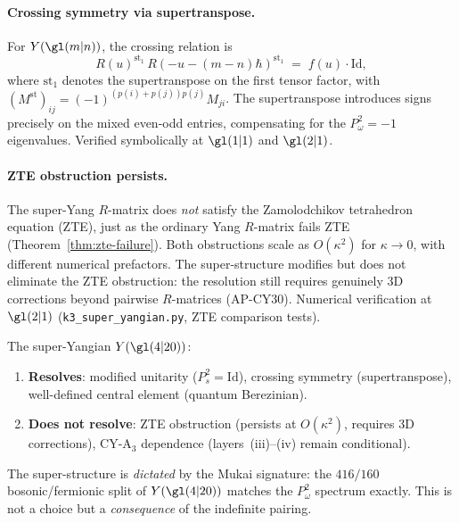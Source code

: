 \paragraph{Crossing symmetry via supertranspose.}
For $Y(\gl(m|n))$, the crossing relation is
\[
  R(u)^{\mathrm{st}_1}\, R(-u - (m-n)\hbar)^{\mathrm{st}_1}
  \;=\; f(u) \cdot \mathrm{Id},
\]
where $\mathrm{st}_1$ denotes the supertranspose on the first tensor factor,
with $(M^{\mathrm{st}})_{ij} = (-1)^{(p(i)+p(j))p(j)} M_{ji}$.
The supertranspose introduces signs precisely on the mixed even-odd entries,
compensating for the $P_\omega^2 = -1$ eigenvalues.
Verified symbolically at $\gl(1|1)$ and $\gl(2|1)$.

\paragraph{ZTE obstruction persists.}
The super-Yang $R$-matrix does \emph{not} satisfy the Zamolodchikov
tetrahedron equation (ZTE), just as the ordinary Yang $R$-matrix fails ZTE
(Theorem~\ref{thm:zte-failure}).  Both obstructions scale as
$O(\kappa^2)$ for $\kappa \to 0$, with different numerical prefactors.
The super-structure modifies but does not eliminate the ZTE
obstruction: the resolution still requires genuinely 3D corrections
beyond pairwise $R$-matrices (AP-CY30).
Numerical verification at $\gl(2|1)$
(\texttt{k3\_super\_yangian.py}, ZTE comparison tests).

\begin{remark}
\label{rem:k3-super-summary}
The super-Yangian $Y(\gl(4|20))$:
\begin{enumerate}[label=(\alph*)]
\item \textbf{Resolves}: modified unitarity ($P_s^2 = \mathrm{Id}$),
  crossing symmetry (supertranspose), well-defined central element
  (quantum Berezinian).
\item \textbf{Does not resolve}: ZTE obstruction (persists at $O(\kappa^2)$,
  requires 3D corrections), CY-A$_3$ dependence (layers~(iii)--(iv)
  remain conditional).
\end{enumerate}
The super-structure is \emph{dictated} by the Mukai signature:
the $416/160$ bosonic/fermionic split of $Y(\gl(4|20))$ matches
the $P_\omega^2$ spectrum exactly.  This is not a choice but a
\emph{consequence} of the indefinite pairing.
\end{remark}



